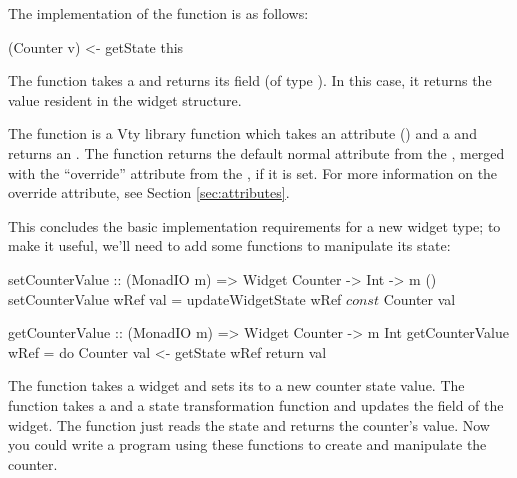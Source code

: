 The implementation of the  function is as follows:

\begin{haskellcode}
 (Counter v) <- getState this
\end{haskellcode}

The  function takes a  and returns its
 field (of type ).  In this case, it returns the
 value resident in the widget structure.


The  function is a Vty library function which takes an
attribute () and a  and returns an .
The  function returns the default normal attribute
from the , merged with the ``override'' attribute
from the , if it is set.  For more information on
the override attribute, see Section \vref{sec:attributes}.

This concludes the basic implementation requirements for a new widget
type; to make it useful, we'll need to add some functions to
manipulate its state:

\begin{haskellcode}
 setCounterValue :: (MonadIO m) => Widget Counter -> Int -> m ()
 setCounterValue wRef val =
    updateWidgetState wRef $ const $ Counter val

 getCounterValue :: (MonadIO m) => Widget Counter -> m Int
 getCounterValue wRef = do
    Counter val <- getState wRef
    return val
\end{haskellcode}

The  function takes a  widget and sets
its  to a new counter state value.  The
 function takes a  and a state
transformation function and updates the  field of the
widget.  The  function just reads the state and
returns the counter's value.  Now you could write a program using
these functions to create and manipulate the counter.
